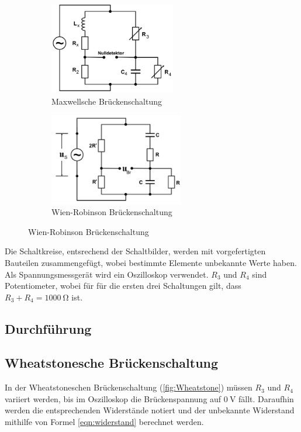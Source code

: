 \begin{figure}
    \begin{subfigure}{0.5\textwidth}
        \centering
        \includegraphics[height=4cm]{Bilder/Maxwell}
        \caption{Maxwellsche Brückenschaltung}
        \label{fig:Maxwell}
    \end{subfigure}
    \begin{subfigure}{0.5\textwidth}
        \centering
        \includegraphics[height=4cm]{Bilder/Wien-Robinson}
        \caption{Wien-Robinson Brückenschaltung}
        \label{fig:Wien}
    \end{subfigure}
\end{figure}
\cite{v302}

\noindent Die Schaltkreise, entsrechend der Schaltbilder, werden%
mit vorgefertigten Bauteilen zusammengefügt, wobei bestimmte Elemente unbekannte Werte haben.
Als Spannungsmessgerät wird ein Oszilloskop verwendet. $R_3$ und $R_4$ sind Potentiometer, wobei für
für die ersten drei Schaltungen gilt, dass $R_3+R_4=\qty{1000}{\ohm}$ ist.

\subsection{Durchführung}

\subsection{Wheatstonesche Brückenschaltung}
In der Wheatstoneschen Brückenschaltung (\ref{fig:Wheatstone}) müssen $R_3$ und $R_4$ variiert werden, 
bis im Oszilloskop die Brückenspannung auf $\qty{0}{\volt}$ fällt. Daraufhin werden die entsprechenden Widerstände
notiert und der unbekannte Widerstand mithilfe von Formel \ref{eqn:widerstand} berechnet werden.

